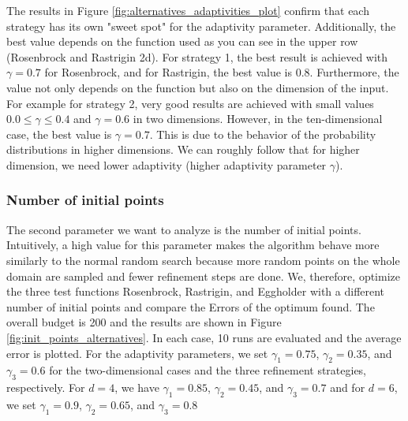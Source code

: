 The results in Figure \ref{fig:alternatives_adaptivities_plot} confirm that each strategy has its own "sweet spot" for the adaptivity parameter. Additionally, the best value depends on the function used as you can see in the upper row (Rosenbrock and Rastrigin 2d). For strategy 1, the best result is achieved with $ \gamma = 0.7 $ for Rosenbrock, and for Rastrigin, the best value is 0.8. Furthermore, the value not only depends on the function but also on the dimension of the input. For example for strategy 2, very good results are achieved with small values $ 0.0 \le \gamma \le 0.4 $ and $ \gamma = 0.6 $ in two dimensions. However, in the ten-dimensional case, the best value is $ \gamma = 0.7 $. This is due to the behavior of the probability distributions in higher dimensions. We can roughly follow that for higher dimension, we need lower adaptivity (higher adaptivity parameter $ \gamma $).

\subsubsection{Number of initial points}

The second parameter we want to analyze is the number of initial points. Intuitively, a high value for this parameter makes the algorithm behave more similarly to the normal random search because more random points on the whole domain are sampled and fewer refinement steps are done. We, therefore, optimize the three test functions Rosenbrock, Rastrigin, and Eggholder with a different number of initial points and compare the Errors of the optimum found. The overall budget is 200 and the results are shown in Figure \ref{fig:init_points_alternatives}. In each case, 10 runs are evaluated and the average error is plotted. For the adaptivity parameters, we set $ \gamma_1 = 0.75 $, $ \gamma_2 = 0.35 $, and $ \gamma_3 = 0.6 $ for the two-dimensional cases and the three refinement strategies, respectively. For $ d = 4 $, we have $ \gamma_1 = 0.85 $, $ \gamma_2 = 0.45 $, and $ \gamma_3 = 0.7 $ and for $ d = 6 $, we set $ \gamma_1 = 0.9 $, $ \gamma_2 = 0.65 $, and $ \gamma_3 = 0.8 $ \newline


